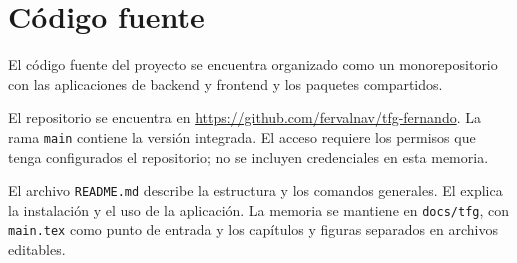 \chapter{Código fuente}
\label{appendix:source-code}

El código fuente del proyecto se encuentra organizado como un monorepositorio
con las aplicaciones de backend y frontend y los paquetes compartidos.

El repositorio se encuentra en
\url{https://github.com/fervalnav/tfg-fernando}. La rama \texttt{main} contiene
la versión integrada. El acceso requiere los permisos que tenga configurados
el repositorio; no se incluyen credenciales en esta memoria.

El archivo \texttt{README.md} describe la estructura y los comandos generales.
El  explica la instalación y el uso de la aplicación.
La memoria se mantiene en \texttt{docs/tfg}, con \texttt{main.tex} como punto
de entrada y los capítulos y figuras separados en archivos editables.
